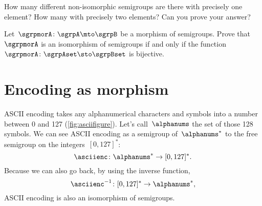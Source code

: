 
\begin{gradedexercise}
    \label{ex:non-isomorphic}
    How many different non-isomorphic semigroups are there with precisely one element?
    How many with precisely two elements?
    Can you prove your answer?
\end{gradedexercise}

\begin{gradedexercise}
    \label{ex:CharacterizeSemigroupIsos}
    \label{ex:semi-morph}
    Let~$\sgrpmorA\colon \sgrpA \mto \sgrpB$ be a morphism of semigroups.
    Prove that~$\sgrpmorA$ is an isomorphism of semigroups if and only if the function~$\sgrpmorA \colon \sgrpAset \sto \sgrpBset$ is bijective.
\end{gradedexercise}

\section{Encoding as morphism }

\begin{example}
    ASCII encoding takes any alphanumerical characters and symbols into a number between 0 and 127 (\cref{fig:asciifigure}).
    Let's call~$\alphanums$ the set of those 128 symbols.
    We can see ASCII encoding as a semigroup \whomo of~$\alphanums^*$ to the free semigroup on the integers~$[0,127]^*$:
    \begin{equation*}
        \label{eq:ASCII-semi}
        \asciienc\colon \alphanums^* \to  [0,127]^*.
    \end{equation*}
    Because we can also go back, by using the inverse function,
    \begin{equation*}
        \label{eq:ASCII-semi-inv}
        \asciienc^{-1}\colon  [0,127]^*  \to  \alphanums^*,
    \end{equation*}
    ASCII encoding is also an isomorphism of semigroups.
\end{example}

